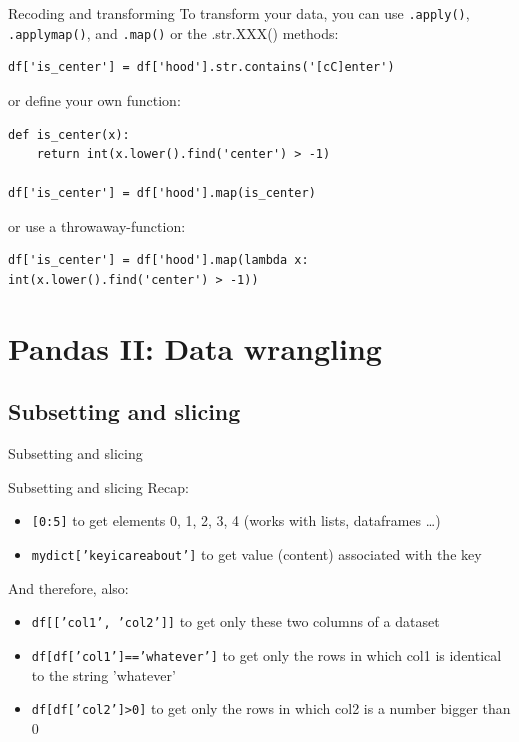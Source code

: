 \documentclass[handout]{beamer}
\begin{document}
\begin{frame}[fragile]{Recoding and transforming}
To transform your data, you can use \texttt{.apply()}, \texttt{.applymap()}, and \texttt{.map()} or the .str.XXX() methods:

\begin{lstlisting}
df['is_center'] = df['hood'].str.contains('[cC]enter')
\end{lstlisting}
or define your own function:
\begin{lstlisting}
def is_center(x):
    return int(x.lower().find('center') > -1)
    
df['is_center'] = df['hood'].map(is_center)
\end{lstlisting}
or use a throwaway-function:
\begin{lstlisting}
df['is_center'] = df['hood'].map(lambda x: int(x.lower().find('center') > -1))
\end{lstlisting}


\end{frame}




\section{Pandas II: Data wrangling}
\subsection{Subsetting and slicing}

\begin{frame}[plain]
Subsetting and slicing
\end{frame}

\begin{frame}{Subsetting and slicing}
Recap:
\begin{itemize}[<+->]
	\item \texttt{[0:5]} to get elements 0, 1, 2, 3, 4 (works with lists, dataframes \ldots)
	\item \texttt{mydict['keyicareabout']} to get value (content) associated with the key
\end{itemize}

\pause

And therefore, also:

\begin{itemize}[<+->]
	\item \texttt{df[['col1', 'col2']]} to get only these two columns of a dataset
	\item \texttt{df[df['col1']=='whatever']} to get only the rows in which col1 is identical to the string 'whatever'
	\item \texttt{df[df['col2']>0]} to get only the rows in which col2 is a number bigger than 0
\end{itemize}


\end{frame}
\end{document}
